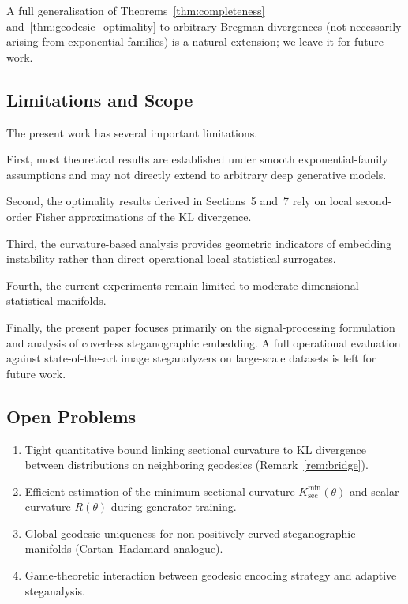 \documentclass[a4paper,fleqn]{cas-dc}
\begin{document}
A full generalisation of Theorems~\ref{thm:completeness}
and~\ref{thm:geodesic_optimality} to arbitrary Bregman divergences
(not necessarily arising from exponential families) is a natural
extension; we leave it for future work.




\subsection{Limitations and Scope}\label{sec:limitations}

The present work has several important limitations.

First, most theoretical results are established under smooth exponential-family assumptions and may not directly extend to arbitrary deep generative models.

Second, the optimality results derived in Sections~5 and~7 rely on local second-order Fisher approximations of the KL divergence.

Third, the curvature-based analysis provides geometric indicators of embedding instability rather than direct operational local statistical surrogates.

Fourth, the current experiments remain limited to moderate-dimensional
statistical manifolds.

Finally, the present paper focuses primarily on the signal-processing
formulation and analysis of coverless steganographic embedding. A full
operational evaluation against state-of-the-art image steganalyzers on
large-scale datasets is left for future work.

\subsection{Open Problems}

\begin{enumerate}
  \item Tight quantitative bound linking sectional curvature to KL
        divergence between distributions on neighboring geodesics
        (Remark~\ref{rem:bridge}).
  \item Efficient estimation of the minimum sectional curvature
        $K_{\sec}^{\min}(\theta)$ and scalar curvature $R(\theta)$
        during generator training.
  \item Global geodesic uniqueness for non-positively curved
        steganographic manifolds (Cartan--Hadamard analogue).
  \item Game-theoretic interaction between geodesic encoding strategy
        and adaptive steganalysis.
\end{enumerate}
\end{document}
